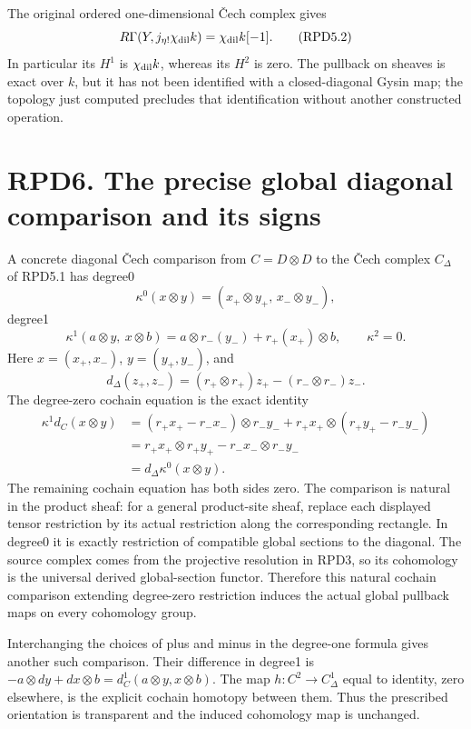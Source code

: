 The original ordered one-dimensional Čech complex gives \[
R\Gamma(Y,j_{\eta!}\chi_{\rm dil}k)
=\chi_{\rm dil}k[-1].
\tag{RPD5.2}
\] In particular its \(H^1\) is \(\chi_{\rm dil}k\), whereas its \(H^2\)
is zero. The pullback on sheaves is exact over \(k\), but it has not
been identified with a closed-diagonal Gysin map; the topology just
computed precludes that identification without another constructed
operation.

\section{RPD6. The precise global diagonal comparison and its
signs}\label{rpd6.-the-precise-global-diagonal-comparison-and-its-signs}

A concrete diagonal Čech comparison from \(C=D\otimes D\) to the Čech
complex \(C_\Delta\) of RPD5.1 has degree0 \[
\kappa^0(x\otimes y)=(x_+\otimes y_+,\,x_-\otimes y_-),
\] degree1 \[
\kappa^1(a\otimes y,\ x\otimes b)
=a\otimes r_-(y_-)+r_+(x_+)\otimes b,
\qquad \kappa^2=0.
\tag{RPD6.1}
\] Here \(x=(x_+,x_-)\), \(y=(y_+,y_-)\), and \[
d_\Delta(z_+,z_-)
=(r_+\otimes r_+)z_+-(r_-\otimes r_-)z_-.
\] The degree-zero cochain equation is the exact identity \[
\begin{aligned}
\kappa^1d_C(x\otimes y)
&=(r_+x_+-r_-x_-)\otimes r_-y_-
+r_+x_+\otimes(r_+y_+-r_-y_-)\\
&=r_+x_+\otimes r_+y_+-r_-x_-\otimes r_-y_-\\
&=d_\Delta\kappa^0(x\otimes y).
\end{aligned}
\tag{RPD6.2}
\] The remaining cochain equation has both sides zero. The comparison is
natural in the product sheaf: for a general product-site sheaf, replace
each displayed tensor restriction by its actual restriction along the
corresponding rectangle. In degree0 it is exactly restriction of
compatible global sections to the diagonal. The source complex comes
from the projective resolution in RPD3, so its cohomology is the
universal derived global-section functor. Therefore this natural cochain
comparison extending degree-zero restriction induces the actual global
pullback maps on every cohomology group.

Interchanging the choices of plus and minus in the degree-one formula
gives another such comparison. Their difference in degree1 is
\(-a\otimes dy+dx\otimes b=d_C^1(a\otimes y,x\otimes b)\). The map
\(h:C^2\to C_\Delta^1\) equal to identity, zero elsewhere, is the
explicit cochain homotopy between them. Thus the prescribed orientation
is transparent and the induced cohomology map is unchanged.

